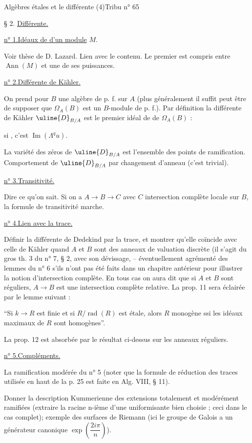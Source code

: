 
Algèbres étales et le différente (4)\hfill Tribu n° 65

§ 2. \uline{Différente.}

\uline{n° 1.}\quad \uline{Idéaux de  d'un module} $M$.

Voir thèse de D. Lazard. Lien avec le contenu. Le premier  est compris entre $\operatorname{Ann}(M)$ et une de ses puissances.

\uline{n° 2.}\quad \uline{Différente de Kähler.}

On prend pour $B$ une algèbre de p. f. sur $A$ (plus généralement il suffit peut être de supposer que $\Omega_A(B)$ est un $B$-module de p. f.). Par définition la différente de Kähler $\uline{D}_{B/A}$ est le premier idéal de  de $\Omega_A(B)$ :
\margin{\unsure{!}}

si
, c'est $\operatorname{Im}(\Lambda^q u)$.

La variété des zéros de $\uline{D}_{B/A}$ est l'ensemble des points de ramification. Comportement de $\uline{D}_{B/A}$ par changement d'anneau (c'est trivial).

\uline{n° 3.}\quad \uline{Transitivité.}

Dire ce qu'on sait. Si on a $A\to B\to C$ avec $C$ intersection complète locale sur $B$, la formule de transitivité marche.

\uline{n° 4.}\quad \uline{Lien avec la trace.}

Définir la différente de Dedekind par la trace, et montrer qu'elle coïncide avec celle de Kähler quand $A$ et $B$ sont des anneaux de valuation discrète (il s'agit du gros th. 3 du n° 7, § 2, avec son dévissage, -- éventuellement agrémenté des lemmes du n° 6 s'ils n'ont pas été faits dans un chapitre antérieur pour illustrer la notion d'intersection complète. En tous cas on aura dit que si $A$ et $B$ sont réguliers, $A\to B$ est une intersection complète relative. La prop. 11 sera éclairée par le lemme suivant :

``Si $k\to R$ est finie et si $R/\operatorname{rad}(R)$ est étale, alors $R$ monogène ssi les idéaux maximaux de $R$ sont homogènes''.

La prop. 12 est absorbée par le résultat ci-dessus sur les anneaux réguliers.

\uline{n° 5.}\quad \uline{Compléments.}

La ramification modérée du n° 5 (noter que la formule de réduction des traces utilisée en haut de la p. 25 est faite en Alg. VIII, § 11).

Donner la description Kummerienne des extensions totalement et modérément ramifiées (extraire la racine n-ième d'une uniformisante bien choisie ; ceci dans le cas complet); exemple des surfaces de Riemann (ici le groupe de Galois a un générateur canonique $\exp\left(\dfrac{2i\pi}{n}\right)$).

